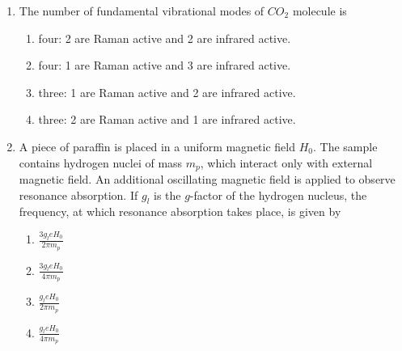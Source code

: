 \documentclass[journal]{IEEEtran}
\begin{document}
\begin{enumerate}[start=35]
\item The number of fundamental vibrational modes of $CO_2$ molecule is 
\begin{enumerate}
    \item four: 2 are Raman active and 2 are infrared active.
    \item four: 1 are Raman active and 3 are infrared active.
    \item three: 1 are Raman active and 2 are infrared active.
    \item three: 2 are Raman active and 1 are infrared active.
\end{enumerate}
\item A piece of paraffin is placed in a uniform magnetic field $H_0$. The sample contains hydrogen nuclei of mass $m_p$, which interact only with external magnetic field. An additional oscillating magnetic field is applied to observe resonance absorption. If $g_l$ is the $g$-factor of the hydrogen nucleus, the frequency, at which resonance absorption takes place, is given by
\begin{multicols}{4}
    \begin{enumerate}
        \item $\frac{3g_leH_0}{2\pi m_p}$
        \item $\frac{3g_leH_0}{4\pi m_p}$
        \item $\frac{g_leH_0}{2\pi m_p}$
        \item $\frac{g_leH_0}{4\pi m_p}$
    \end{enumerate}
\end{multicols}
\end{enumerate}
\end{document}
